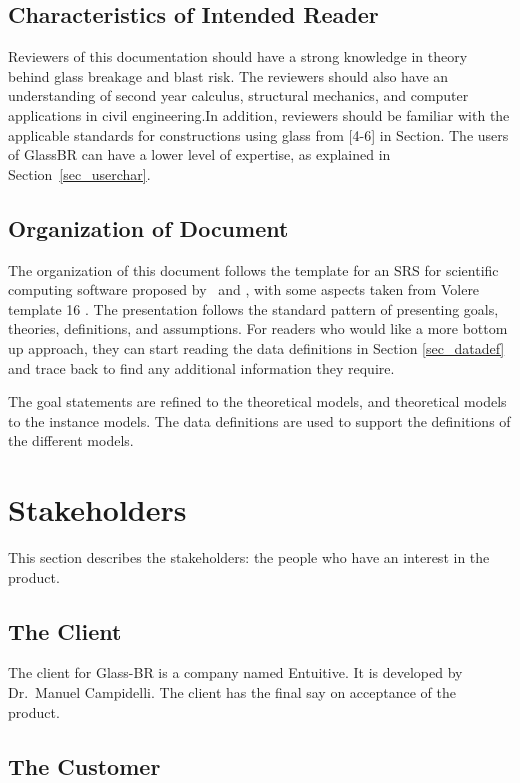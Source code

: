 \documentclass[12pt]{article}
\newcommand{\progname}{Glass-BR}
\begin{document}
\subsection{Characteristics of Intended Reader}
\label{Sec:CharofInteRead}
Reviewers of this documentation should have a strong knowledge in theory behind
glass breakage and blast risk. The reviewers should also have an understanding
of second year calculus, structural mechanics, and computer applications in
civil engineering.In addition, reviewers should be familiar with the applicable
standards for constructions using glass from {[}4-6{]} in
Section. The users of GlassBR can have a lower level of
expertise, as explained in Section~\ref{sec_userchar}.

\subsection{Organization of Document}

The organization of this document follows the template for an SRS for scientific
computing software proposed by~\cite{Koothoor2013} and \cite{SmithAndLai2005},
with some aspects taken from Volere template 16 \cite{Volere}. The presentation
follows the standard pattern of presenting goals, theories, definitions, and
assumptions.  For readers who would like a more bottom up approach, they can
start reading the data definitions in Section \ref{sec_datadef} and trace back
to find any additional information they require.

The goal statements are refined to the theoretical models, and theoretical
models to the instance models. The data definitions are used to support the
definitions of the different models.

\section{Stakeholders}

This section describes the stakeholders: the people who have an interest in the
product.

\subsection{The Client}

The client for \progname{} is a company named Entuitive. It is developed by
Dr.\ Manuel Campidelli. The client has the final say on acceptance of the product.

\subsection{The Customer}
\end{document}
